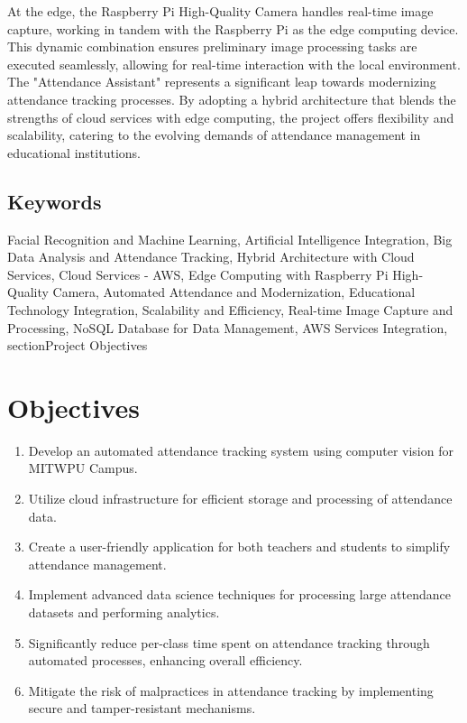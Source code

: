 \documentclass[11pt]{article}
\begin{document}
At the edge, the Raspberry Pi High-Quality Camera handles real-time image capture, working in tandem with the Raspberry Pi as the edge computing device. This dynamic combination ensures preliminary image processing tasks are executed seamlessly, allowing for real-time interaction with the local environment.\\

The "Attendance Assistant" represents a significant leap towards modernizing attendance tracking processes. By adopting a hybrid architecture that blends the strengths of cloud services with edge computing, the project offers flexibility and scalability, catering to the evolving demands of attendance management in educational institutions.

\subsection*{Keywords}
Facial Recognition and Machine Learning, Artificial Intelligence Integration, Big Data Analysis and Attendance Tracking, Hybrid Architecture with Cloud Services, Cloud Services - AWS, Edge Computing with Raspberry Pi High-Quality Camera, Automated Attendance and Modernization, Educational Technology Integration, Scalability and Efficiency, Real-time Image Capture and Processing, NoSQL Database for Data Management, AWS Services Integration, section{Project Objectives}

\section{Objectives}

\begin{enumerate}
    \item Develop an automated attendance tracking system using computer vision for MITWPU Campus.
    
    \item Utilize cloud infrastructure for efficient storage and processing of attendance data.

    \item Create a user-friendly application for both teachers and students to simplify attendance management.

    \item Implement advanced data science techniques for processing large attendance datasets and performing analytics.

    \item Significantly reduce per-class time spent on attendance tracking through automated processes, enhancing overall efficiency.

    \item Mitigate the risk of malpractices in attendance tracking by implementing secure and tamper-resistant mechanisms.
\end{enumerate}
\end{document}

